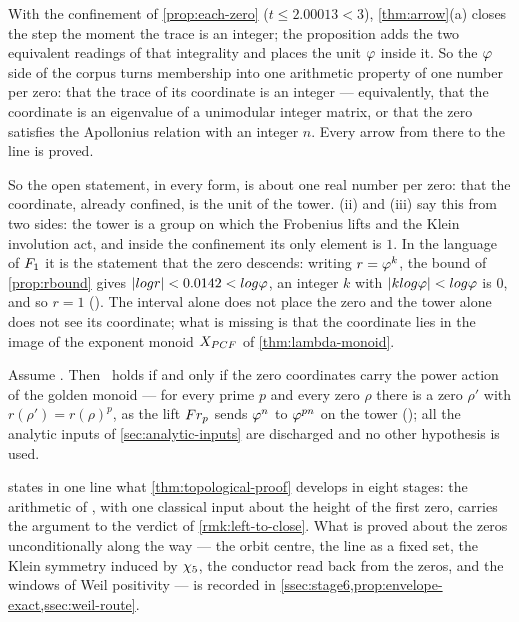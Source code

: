 With the confinement of \cref{prop:each-zero} ($t\le2.00013<3$), \cref{thm:arrow}(a) closes
the step the moment the trace is an integer; the proposition adds the two equivalent
readings of that integrality and places the unit $\varphi$ inside it.  So the $\varphi$ side of the corpus turns membership into one arithmetic property of one number per zero: that the trace of its coordinate is an
integer --- equivalently, that the coordinate is an eigenvalue of a unimodular integer
matrix, or that the zero satisfies the Apollonius relation with an integer $n$.  Every
arrow from there to the line is proved.

So the open statement, in every form, is about one real number per zero: that the
coordinate, already confined, is the unit of the tower.  (ii)
and (iii) say this from two sides: the tower is a group on which the Frobenius lifts and
the Klein involution act, and inside the confinement its only element is $1$.  In the
language of $F_1$ it is the statement that the zero descends: writing $r=\varphi^k$, the
bound of \cref{prop:rbound} gives $|log r|<0.0142<log\varphi$, an integer $k$ with
$|klog\varphi|<log\varphi$ is $0$, and so $r=1$ ().  The interval alone does
not place the zero and the tower alone does not see its coordinate; what is missing is
that the coordinate lies in the image of the exponent monoid $X_{PCF}$ of
\cref{thm:lambda-monoid}.

\begin{theorem}\label{thm:reduction}
Assume .  Then \Ecore\ holds if and only if the
zero coordinates carry the power action of the golden monoid --- for every prime $p$ and every zero $\rho$ there is a zero
$\rho'$ with $r(\rho')=r(\rho)^p$, as the lift $Fr_p$ sends $\varphi^n$ to $\varphi^{pn}$ on the tower
(); all the analytic
inputs of \cref{sec:analytic-inputs} are discharged and no other hypothesis is
used.
%
\end{theorem}

\begin{remark}
 states in one line what \cref{thm:topological-proof} develops
in eight stages: the arithmetic of , with one classical input about the
height of the first zero, carries the argument to the verdict of
\cref{rmk:left-to-close}.  What is proved about the zeros unconditionally along the
way --- the orbit centre, the line as a fixed set, the Klein symmetry induced by
$\chi_5$, the
conductor read back from the zeros, and the windows of Weil positivity --- is
recorded in \cref{ssec:stage6,prop:envelope-exact,ssec:weil-route}.
\end{remark}

